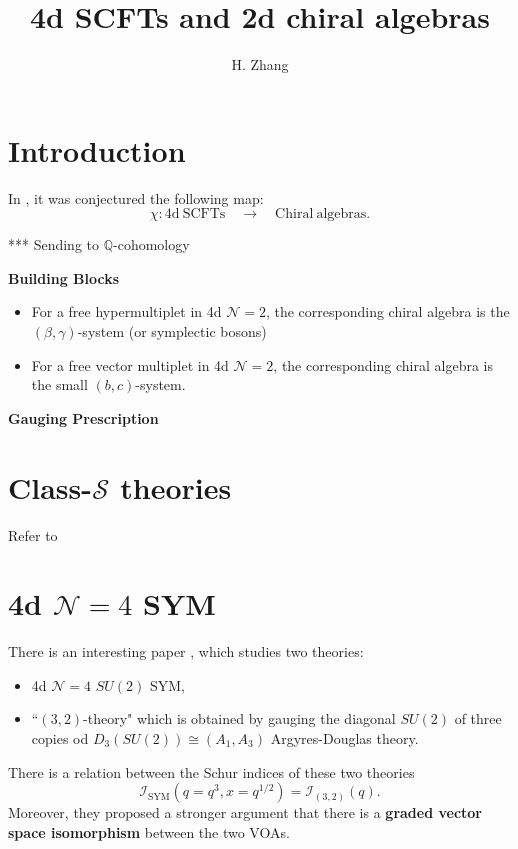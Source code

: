 \documentclass[a4paper,11pt]{article}
\title{\boldmath 4d SCFTs and 2d chiral algebras}
\author{H. Zhang}
\affiliation{Virginia Tech}
\begin{document}
\maketitle
\flushbottom

\section{Introduction}
In \cite{Beem:2013sza}, it was conjectured the following map:
\begin{equation}
    \chi: \mathrm{4d~SCFTs} \quad \rightarrow \quad \mathrm{Chiral~algebras}.
\end{equation}

*** Sending to $\mathbb{Q}$-cohomology

\bigskip
\noindent\textbf{Building Blocks}
\begin{itemize}
    \item For a free hypermultiplet in 4d $\mathcal{N}=2$, the corresponding chiral algebra is the $(\beta, \gamma)$-system (or symplectic bosons)
    \item For a free vector multiplet in 4d $\mathcal{N}=2$, the corresponding chiral algebra is the small $(b,c)$-system.
\end{itemize}

\bigskip
\noindent\textbf{Gauging Prescription}

\newpage
\section{Class-$\mathcal{S}$ theories}

Refer to \cite{Beem:2014rza}




\newpage
\section{4d $\mathcal{N}=4$ SYM}
There is an interesting paper \cite{Buican:2020moo}, which studies two theories:
\begin{itemize}
    \item 4d $\mathcal{N}=4$ $SU(2)$ SYM,
    \item ``$(3,2)$-theory" which is obtained by gauging the diagonal $SU(2)$ of three copies od $D_3(SU(2)) \cong (A_1,A_3)$ Argyres-Douglas theory.
\end{itemize}
There is a relation between the Schur indices of these two theories
\begin{equation}
    \mathcal{I}_\mathrm{SYM} (q = q^3, x = q^{1/2}) = \mathcal{I}_{(3,2)}(q).
\end{equation}
Moreover, they proposed a stronger argument that there is a \textbf{graded vector space isomorphism} between the two VOAs.
\end{document}
